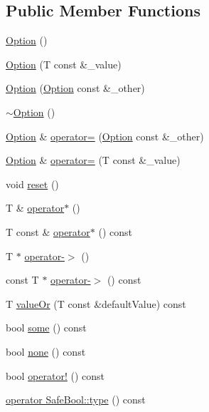\subsection*{Public Member Functions}
\begin{DoxyCompactItemize}
\item 
\hyperlink{class_catch_1_1_option_a8efb01b593d798decc80cbbdf311f2a3}{Option} ()
\item 
\hyperlink{class_catch_1_1_option_a5aeb9c22d48a6882bdf5fb4730b06c86}{Option} (T const \&\-\_\-value)
\item 
\hyperlink{class_catch_1_1_option_af02f2e4559f06384baec0def8c68c5fd}{Option} (\hyperlink{class_catch_1_1_option}{Option} const \&\-\_\-other)
\item 
\hyperlink{class_catch_1_1_option_a37fe90bb47bb909f150a5ad6be25581a}{$\sim$\-Option} ()
\item 
\hyperlink{class_catch_1_1_option}{Option} \& \hyperlink{class_catch_1_1_option_a78c65b15dd6b2fbd04c5012c43017c8f}{operator=} (\hyperlink{class_catch_1_1_option}{Option} const \&\-\_\-other)
\item 
\hyperlink{class_catch_1_1_option}{Option} \& \hyperlink{class_catch_1_1_option_a2be7e343ab22d6061726d32ab4622653}{operator=} (T const \&\-\_\-value)
\item 
void \hyperlink{class_catch_1_1_option_a37b4e0e5d4d56296adacd267a616f4e0}{reset} ()
\item 
T \& \hyperlink{class_catch_1_1_option_afd989852fa453731c3190dac63caccb0}{operator$\ast$} ()
\item 
T const \& \hyperlink{class_catch_1_1_option_a0f05708905dc6b0b470fb24f5d265631}{operator$\ast$} () const 
\item 
T $\ast$ \hyperlink{class_catch_1_1_option_acad340798a16c8f700f8763119e90f31}{operator-\/$>$} ()
\item 
const T $\ast$ \hyperlink{class_catch_1_1_option_a0800340b2971748671b88acfb14bb928}{operator-\/$>$} () const 
\item 
T \hyperlink{class_catch_1_1_option_a21b5629a7febbe3e23c475c9d9138a2d}{value\-Or} (T const \&default\-Value) const 
\item 
bool \hyperlink{class_catch_1_1_option_affa96f15798b4656fb753ff52d12dec2}{some} () const 
\item 
bool \hyperlink{class_catch_1_1_option_a389324d2aa20ceb0eb0f48a5f77c20c8}{none} () const 
\item 
bool \hyperlink{class_catch_1_1_option_a47a1b6f6def2730ea9d27a1860a4f97f}{operator!} () const 
\item 
\hyperlink{class_catch_1_1_option_a637d4366ae7f0ded52ce59c8cb06da7b}{operator Safe\-Bool\-::type} () const 
\end{DoxyCompactItemize}


